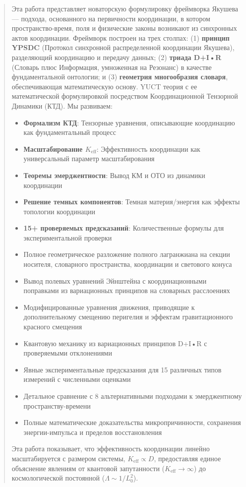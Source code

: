 \documentclass[11pt,a4paper]{article}
\begin{document}
	\begin{abstract}
		Эта работа представляет новаторскую формулировку фреймворка Якушева — подхода, основанного на первичности координации, в котором пространство-время, поля и физические законы возникают из синхронных актов координации. Фреймворк построен на трех столпах: (1) \textbf{принцип YPSDC} (Протокол синхронной распределенной координации Якушева), разделяющий координацию и передачу данных; (2) \textbf{триада D+I•R} (Словарь плюс Информация, умноженная на Резонанс) в качестве фундаментальной онтологии; и (3) \textbf{геометрия многообразия словаря}, обеспечивающая математическую основу. YUCT теория с ее математической формулировкой посредством Координационной Тензорной Динамики (КТД). Мы развиваем:
		\begin{itemize}
			\item \textbf{Формализм КТД}: Тензорные уравнения, описывающие координацию как фундаментальный процесс
			\item \textbf{Масштабирование $K_{\mathrm{eff}}$}: Эффективность координации как универсальный параметр масштабирования
			\item \textbf{Теоремы эмерджентности}: Вывод КМ и ОТО из динамики координации
			\item \textbf{Решение темных компонентов}: Темная материя/энергия как эффекты топологии координации
			\item \textbf{15+ проверяемых предсказаний}: Количественные формулы для экспериментальной проверки
			\item Полное геометрическое разложение полного лагранжиана на секции носителя, словарного пространства, координации и светового конуса
			\item Вывод полевых уравнений Эйнштейна с координационными поправками из вариационных принципов на словарных расслоениях
			\item Модифицированные уравнения движения, приводящие к дополнительному смещению перигелия и эффектам гравитационного красного смещения
			\item Квантовую механику из вариационных принципов D+I•R с проверяемыми отклонениями
			\item Явные экспериментальные предсказания для 15 различных типов измерений с численными оценками
			\item Детальное сравнение с 8 альтернативными подходами к эмерджентному пространству-времени
			\item Полные математические доказательства микропричинности, сохранения энергии-импульса и пределов восстановления
		\end{itemize}
		Эта работа показывает, что эффективность координации линейно масштабируется с размером системы, $K_{\mathrm{eff}} \propto D$, предоставляя единое объяснение явлениям от квантовой запутанности ($K_{\mathrm{eff}} \to \infty$) до космологической постоянной ($\Lambda \sim 1/L_0^2$).
		

\end{abstract}
\end{document}
